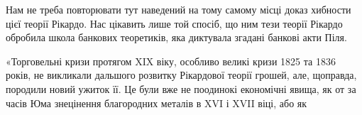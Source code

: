 Нам не треба повторювати тут наведений на тому самому місці доказ
хибности цієї теорії Рікардо. Нас цікавить лише той спосіб, що ним тези
теорії Рікардо обробила школа банкових теоретиків, яка диктувала згадані банкові
акти Піля.

«Торговельні кризи протягом XIX віку, особливо великі кризи 1825 та
1836 років, не викликали дальшого розвитку Рікардової теорії грошей, але, щоправда,
породили новий ужиток її. Це були вже не поодинокі економічні явища,
як от за часів Юма знецінення благородних металів в XVI і XVII віці, або як